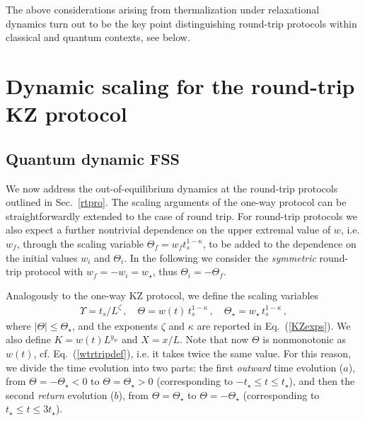 The above considerations arising from thermalization under
relaxational dynamics turn out to be the key point distinguishing
round-trip protocols within classical and quantum contexts, see below.

\section{Dynamic scaling for the round-trip KZ protocol}
\label{roundtrip}

\subsection{Quantum dynamic FSS}
\label{qfssKZroundtrip}

We now address the out-of-equilibrium dynamics at the round-trip
protocols outlined in Sec.~\ref{rtpro}.  The scaling arguments of the
one-way protocol can be straightforwardly extended to the case of
round trip. For round-trip protocols we also expect a further
nontrivial dependence on the upper extremal value of $w$, i.e. $w_f$,
through the scaling variable $\Theta_f=w_f t_s^{1-\kappa}$, to be
added to the dependence on the initial values $w_i$ and $\Theta_i$. In
the following we consider the {\em symmetric} round-trip protocol with
$w_f = - w_i = w_\star$, thus $\Theta_i = - \Theta_f$.

Analogously to the one-way KZ protocol, we define the scaling
variables
\begin{eqnarray}
  \Upsilon = t_s/L^{\zeta}\,, \quad
  \Theta = w(t) \, t_s^{1-\kappa}\,,\quad
  \Theta_\star =  w_\star\, t_s^{1-\kappa} \,,
 \label{scalvar2}
  \end{eqnarray}
where $|\Theta|\le\Theta_\star$, and the exponents $\zeta$ and
$\kappa$ are reported in Eq.~(\ref{KZexps}).  We also define $K=w(t)
L^{y_w}$ and $X = x/L$. Note that now $\Theta$ is nonmonotonic as
$w(t)$, cf. Eq.~(\ref{wtrtripdef}), i.e. it takes twice the same
value. For this reason, we divide the time evolution into two parts:
the first {\em outward} time evolution ($a$), from
$\Theta=-\Theta_\star<0$ to $\Theta=\Theta_\star>0$ (corresponding to
$-t_\star\le t \le t_\star$), and then the second {\em return}
evolution ($b$), from $\Theta=\Theta_\star$ to $\Theta=-\Theta_\star$
(corresponding to $t_\star\le t \le 3t_\star$).

